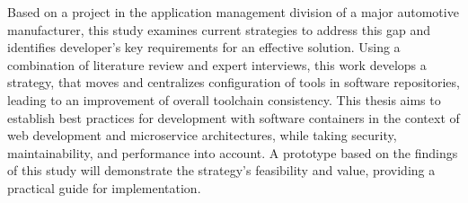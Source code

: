 Based on a project in the application management division of a major automotive manufacturer, this study examines current strategies to address this gap and identifies developer's key requirements for an effective solution. Using a combination of literature review and expert interviews, this work develops a  strategy, that moves and centralizes configuration of tools in software repositories, leading to an improvement of overall toolchain consistency. This thesis aims to establish best practices for development with software containers in the context of web development and microservice architectures, while taking security, maintainability, and performance into account. A prototype based on the findings of this study will demonstrate the strategy’s feasibility and value, providing a practical guide for implementation.
